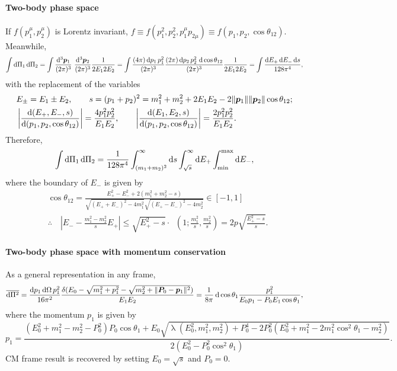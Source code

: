 \documentclass[CheatSheet]{subfiles}
\begin{document}
\paragraph{Two-body phase space}
If $f(p_1^\mu,p_2^\mu)$ is Lorentz invariant, $f\equiv f(p_1^2,p_2^2,p_1^\mu p_{2\mu})\equiv f(p_1,p_2,\cos\theta_{12})$.
Meanwhile,
\begin{equation}
 \int\dd\Pi_1\dd\Pi_2
=
\int\ddP{p_1}\,\,\ddP{p_2}\frac{1}{2E_12E_2}
=
\int\frac{(4\pi)\dd p_1\,p_1^2}{(2\pi)^3}
\frac{(2\pi)\dd p_2\,p_2^2\,\dd\cos\theta_{12}}{(2\pi)^3}\frac{1}{2E_12E_2}
=
\int\frac{\dd E_+\dd E_- \dd s}{128\pi^4},
\end{equation}
with the replacement of the variables
\begin{align*}
& E_\pm = E_1\pm E_2,
\qquad
s=(p_1+p_2)^2=m_1^2 + m_2^2 + 2E_1E_2 - 2\|{\bm{p}}_1\|\|{\bm{p}}_2\|\cos\theta_{12};\\
&
\left|\frac{\mathop{}\!\mathrm{d}(E_+,E_-,s)}{\mathop{}\!\mathrm{d}(p_1, p_2, \cos\theta_{12})}\right|=\frac{4p_1^2p_2^2}{E_1E_2},
\qquad
\left|\frac{\mathop{}\!\mathrm{d}(E_1,E_2,s)}{\mathop{}\!\mathrm{d}(p_1, p_2, \cos\theta_{12})}\right|=\frac{2p_1^2p_2^2}{E_1E_2}.
\end{align*}
Therefore, 
\begin{equation}
 \int\mathop{}\!\mathrm{d}\Pi_1\mathop{}\!\mathrm{d}\Pi_2
=
\frac{1}{128\pi^4}
\int_{(m_1+m_2)^2}^\infty\mathop{}\!\mathrm{d} s
\int_{\sqrt{s}}^\infty\mathop{}\!\mathrm{d} E_+
\int_{\mathrm{min}}^{\mathrm{max}}\mathop{}\!\mathrm{d} E_-,
\end{equation}
where the boundary of $E_-$ is given by
\begin{align*}
 &\cos\theta_{12}=\frac{E_+^2-E_-^2+2 \left(m_1^2+m_2^2-s\right)}{\sqrt{(E_++E_-)^2-4 m_1^2}\sqrt{(E_+-E_-)^2-4 m_2^2}} \in [-1,1]\\
 &\therefore\quad
\left|E_- - \frac{m_1^2-m_2^2}{s}E_+\right| 
\le
\sqrt{E_+^2-s}\cdot\mathop{\lambda^{1/2}}\left(1;\frac{m_1^2}{s},\frac{m_2^2}{s}\right)
=
2p\sqrt{\frac{E_+^2-s}{s}}.
\end{align*}

\paragraph{Two-body phase space with momentum conservation}
As a general representation in any frame,
\begin{equation}
\overline{\mathop{}\!\mathrm{d}\Pi^2}
=\frac{\mathop{}\!\mathrm{d} p_1\mathop{}\!\mathrm{d}\Omega\,p_1^2}{16\pi^2}\frac{\delta(E_0-\sqrt{m_1^2+p_1^2}-\sqrt{m_2^2+\|{\bm{P}}_0-{\bm{p}}_1\|^2})}{E_1E_2}
=\frac{1}{8\pi}\mathop{}\!\mathrm{d}\cos\theta_{1}\frac{p_1^2}{E_0p_1-P_0E_1\cos\theta_1},
\end{equation}
where the momentum $p_1$ is given by
\begin{equation}
p_1=\frac{(E_0^2+m_1^2-m_2^2-P_0^2)P_0\cos\theta_1
 + E_0\sqrt{\mathop{\lambda}(E_0^2,m_1^2,m_2^2)+P_0^4-2P_0^2(E_0^2+m_1^2-2m_1^2\cos^2\theta_1-m_2^2)}
}{2(E_0^2-P_0^2\cos^2\theta_1)}.
\end{equation}
CM frame result is recovered by setting $E_0=\sqrt{s}$ and $P_0=0$.
\end{document}
